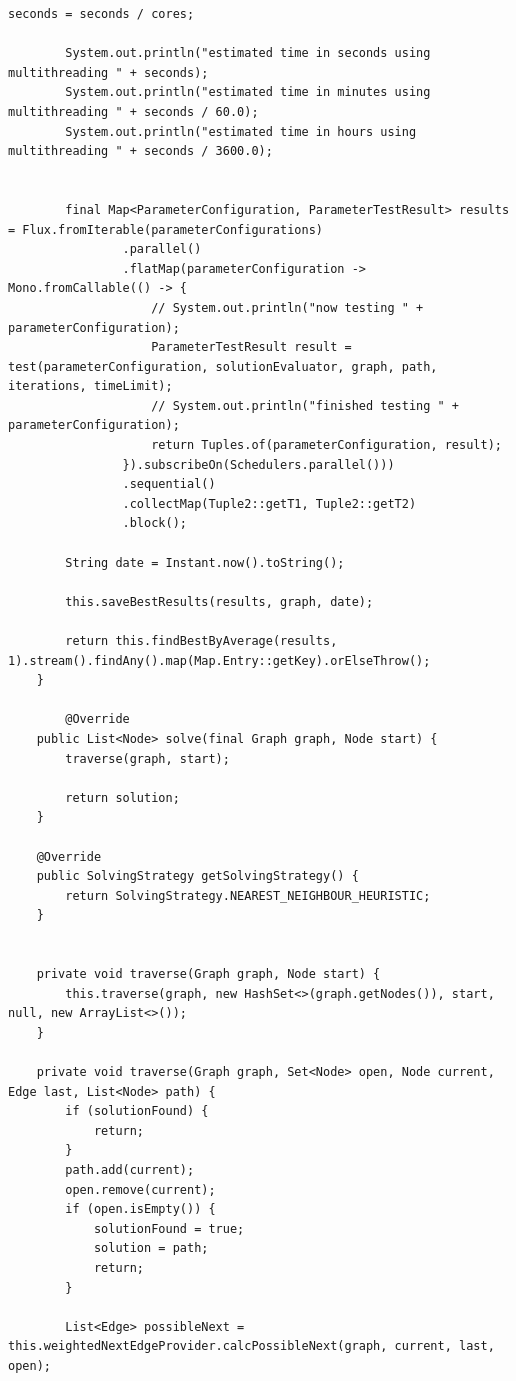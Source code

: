 \begin{lstlisting}[label={lst:source}]
        seconds = seconds / cores;

        System.out.println("estimated time in seconds using multithreading " + seconds);
        System.out.println("estimated time in minutes using multithreading " + seconds / 60.0);
        System.out.println("estimated time in hours using multithreading " + seconds / 3600.0);


        final Map<ParameterConfiguration, ParameterTestResult> results = Flux.fromIterable(parameterConfigurations)
                .parallel()
                .flatMap(parameterConfiguration -> Mono.fromCallable(() -> {
                    // System.out.println("now testing " + parameterConfiguration);
                    ParameterTestResult result = test(parameterConfiguration, solutionEvaluator, graph, path, iterations, timeLimit);
                    // System.out.println("finished testing " + parameterConfiguration);
                    return Tuples.of(parameterConfiguration, result);
                }).subscribeOn(Schedulers.parallel()))
                .sequential()
                .collectMap(Tuple2::getT1, Tuple2::getT2)
                .block();

        String date = Instant.now().toString();

        this.saveBestResults(results, graph, date);

        return this.findBestByAverage(results, 1).stream().findAny().map(Map.Entry::getKey).orElseThrow();
    }

        @Override
    public List<Node> solve(final Graph graph, Node start) {
        traverse(graph, start);

        return solution;
    }

    @Override
    public SolvingStrategy getSolvingStrategy() {
        return SolvingStrategy.NEAREST_NEIGHBOUR_HEURISTIC;
    }


    private void traverse(Graph graph, Node start) {
        this.traverse(graph, new HashSet<>(graph.getNodes()), start, null, new ArrayList<>());
    }

    private void traverse(Graph graph, Set<Node> open, Node current, Edge last, List<Node> path) {
        if (solutionFound) {
            return;
        }
        path.add(current);
        open.remove(current);
        if (open.isEmpty()) {
            solutionFound = true;
            solution = path;
            return;
        }

        List<Edge> possibleNext = this.weightedNextEdgeProvider.calcPossibleNext(graph, current, last, open);


\end{lstlisting}

